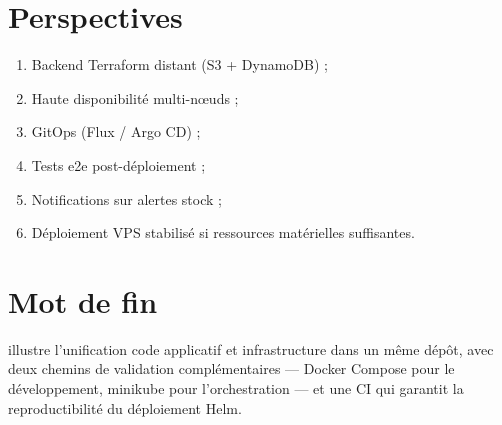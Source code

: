 \section{Perspectives}

\begin{enumerate}
  \item Backend Terraform distant (S3 + DynamoDB) ;
  \item Haute disponibilité multi-nœuds ;
  \item GitOps (Flux / Argo CD) ;
  \item Tests e2e post-déploiement ;
  \item Notifications sur alertes stock ;
  \item Déploiement VPS stabilisé si ressources matérielles suffisantes.
\end{enumerate}

\section{Mot de fin}

\stockflow{} illustre l'unification code applicatif et infrastructure dans un même dépôt, avec deux chemins de validation complémentaires — Docker Compose pour le développement, minikube pour l'orchestration — et une CI qui garantit la reproductibilité du déploiement Helm.
